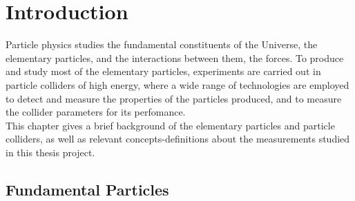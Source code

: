\chapter{Introduction}
\label{ch1}


Particle physics studies the fundamental constituents of the Universe, the elementary particles, and the interactions between them, the forces.  To produce and study most of the elementary particles, experiments are carried out in  particle colliders of high energy, where a wide range of technologies are employed to detect and measure the properties of the particles produced, and to measure the collider parameters for its perfomance.\\  This chapter gives a brief background of the elementary particles and particle colliders, as well as relevant concepts-definitions about the measurements studied in this thesis project.

\section{Fundamental Particles}

